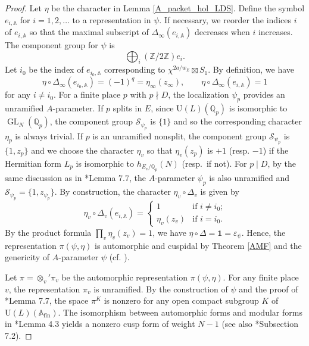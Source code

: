 \documentclass[11pt]{amsart}
\theoremstyle{plain}
\theoremstyle{definition}
\numberwithin{equation}{section}
\def\GL{\mathop{\mathrm{GL}}\nolimits}
\def\U{\mathrm{U}}
\newcommand{\bbA}{\mathbb{A}}
\newcommand{\bbQ}{\mathbb{Q}}
\newcommand{\bbZ}{\mathbb{Z}}
\newcommand{\calS}{\mathcal{S}}
\newcommand{\fini}{\mathrm{fin}}
\newcommand{\vep}{\varepsilon}
\begin{document}
\begin{proof}
Let $\eta$ be the character in Lemma \ref{A_packet_hol_LDS}.
Define the symbol $e_{i,\bbA}$ for $i=1,2,\ldots$ to a representation in $\psi$.
If necessary, we reorder the indices $i$ of $e_{i,\bbA}$ so that the maximal subscript of $\Delta_\infty(e_{i,\bbA})$ decreases when $i$ increases.
The component group for $\psi$ is
\[
\bigoplus_i(\bbZ/2\bbZ) e_i.
\]
Let $i_0$ be the index of $e_{i_0,\bbA}$ corresponding to $\chi^{2a/w_E} \boxtimes S_1$.
By definition, we have
\[
\eta \circ \Delta_\infty(e_{i_0, \bbA}) = (-1)^q = \eta_\infty(z_\infty), \qquad \eta \circ \Delta_\infty(e_{i,\bbA}) = 1
\]
for any $i \neq i_0$.
For a finite place $p$ with $p \nmid D$, the localization $\psi_p$ provides an unramified $A$-parameter.
If $p$ splits in $E$, since $\U(L)(\bbQ_p)$ is isomorphic to $\GL_{N}(\bbQ_p)$, the component group $\calS_{\psi_p}$ is $\{1\}$ and so the corresponding character $\eta_p$ is always trivial.
If $p$ is an unramified nonsplit, the component group $\calS_{\psi_p}$ is $\{1, z_{p}\}$ and we choose the character $\eta_v$ so that $\eta_v(z_{p})$ is $+1$ (resp. $-1$) if the Hermitian form $L_p$ is isomorphic to $h_{E_v/\bbQ_p}(N)$ (resp.\ if not).
For $p \mid D$, 
by the same discussion as in \cite{2025_HMY_Kodaira_dimension_ball_quotients}*{Lemma 7.7}, the $A$-parameter $\psi_p$ is also unramified and $\calS_{\psi_p} = \{1,z_{\psi_p}\}$.
By construction, the character $\eta_v \circ \Delta_v$ is given by
\[
\eta_v \circ \Delta_v(e_{i,\bbA})
=
\begin{cases}
    1 & \text{if $i \neq i_0$;}\\
    \eta_v(z_v) & \text{if $i = i_0$.}
\end{cases}
\]
By the product formula $\prod_v \eta_v(z_v) = 1$, we have $\eta \circ \Delta = \mathbf{1} = \vep_\psi$.
Hence, the representation $\pi(\psi, \eta)$ is automorphic and cuspidal by Theorem \ref{AMF} and the genericity of $A$-parameter $\psi$ (cf. \cite{1984_Wallach_constant_term}).

Let $\pi = \otimes_v' \pi_v$ be the automorphic representation $\pi(\psi,\eta)$.
For any finite place $v$, the representation $\pi_v$ is unramified.
By the construction of $\psi$ and the proof of \cite{2025_HMY_Kodaira_dimension_ball_quotients}*{Lemma 7.7}, the space $\pi^K$ is nonzero for any open compact subgroup $K$ of $\U(L)(\bbA_\fini)$.
The isomorphism between automorphic forms and modular forms in \cite{2025_HMY_Kodaira_dimension_ball_quotients}*{Lemma 4.3} yields a nonzero cusp form of weight $N-1$ (see also \cite{2025_HMY_Kodaira_dimension_ball_quotients}*{Subsection 7.2}).
\end{proof}
\end{document}
